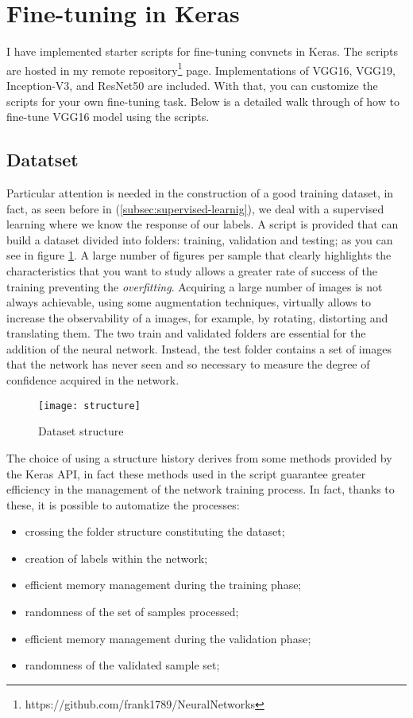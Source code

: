 \section{Fine-tuning in Keras}
\label{sec:finetuningkeras}
%
I have implemented starter scripts for fine-tuning convnets in Keras. 
The scripts are hosted in my remote 
repository\footnote{https://github.com/frank1789/NeuralNetworks} page.
Implementations of VGG16, VGG19, Inception-V3, and ResNet50 are included. 
With that, you can customize the scripts for your own fine-tuning task.
Below is a detailed walk through of how to fine-tune VGG16 model using the 
scripts.
%
\subsection{Datatset}
\label{subsec:dataset}
Particular attention is needed in the construction of a good training dataset, 
in fact, as seen before in (\ref{subsec:supervised-learnig}), we deal with a 
supervised learning where we know the response of our labels.
A script is provided that can build a dataset divided into folders: training, 
validation and testing; as you can see in figure \ref{fig:datasetstructure}.
A large number of figures per sample that clearly highlights the characteristics 
that you want to study allows a greater rate of success of the training 
preventing the \emph{overfitting}.
Acquiring a large number of images is not always achievable, using some 
augmentation techniques, virtually allows to increase the observability of a 
images, for example, by rotating, distorting and translating them.
The two train and validated folders are essential for the addition of the 
neural network.
Instead, the test folder contains a set of images that the network has never 
seen and so necessary to measure the degree of confidence acquired in the network.
%
\begin{figure}[htb]
\centering
\texttt{[image: structure]}
\caption{Dataset structure}
\label{fig:datasetstructure}
\end{figure}
%
The choice of using a structure history derives from some methods provided by 
the Keras API, in fact these methods used in the script guarantee greater 
efficiency in the management of the network training process.
In fact, thanks to these, it is possible to automatize the processes:
\begin{itemize}
\item crossing the folder structure constituting the dataset;
\item creation of labels within the network;
\item efficient memory management during the training phase;
\item randomness of the set of samples processed;
\item efficient memory management during the validation phase;
\item randomness of the validated sample set;
\end{itemize}
%
